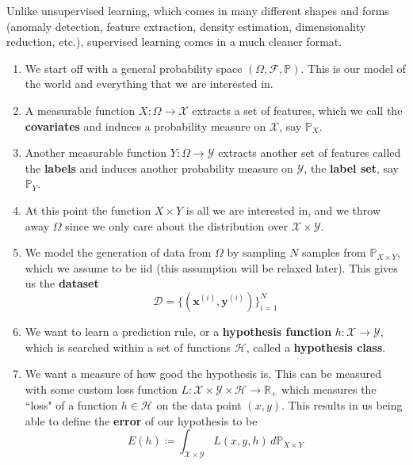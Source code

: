 \documentclass{article}
\begin{document}
    Unlike unsupervised learning, which comes in many different shapes and forms (anomaly detection, feature extraction, density estimation, dimensionality reduction, etc.), supervised learning comes in a much cleaner format. 
    \begin{enumerate}
      \item We start off with a general probability space $(\Omega, \mathcal{F}, \mathbb{P})$. This is our model of the world and everything that we are interested in. 

      \item A measurable function $X: \Omega \rightarrow \mathcal{X}$ extracts a set of features, which we call the \textbf{covariates} and induces a probability measure on $\mathcal{X}$, say $\mathbb{P}_X$. 

      \item Another measurable function $Y: \Omega \rightarrow \mathcal{Y}$ extracts another set of features called the \textbf{labels} and induces another probability measure on $\mathcal{Y}$, the \textbf{label set}, say $\mathbb{P}_Y$. 

      \item At this point the function $X \times Y$ is all we are interested in, and we throw away $\Omega$ since we only care about the distribution over $\mathcal{X} \times \mathcal{Y}$. 

      \item We model the generation of data from $\Omega$ by sampling $N$ samples from $\mathbb{P}_{X \times Y}$, which we assume to be iid (this assumption will be relaxed later). This gives us the \textbf{dataset} 
        \[\mathcal{D} = \{(\mathbf{x}^{(i)}, \mathbf{y}^{(i)}) \}_{i=1}^N\]

      \item We want to learn a prediction rule, or a \textbf{hypothesis function} $h: \mathcal{X} \rightarrow \mathcal{Y}$, which is searched within a set of functions $\mathcal{H}$, called a \textbf{hypothesis class}. 

      \item We want a measure of how good the hypothesis is. This can be measured with some custom loss function $L: \mathcal{X} \times \mathcal{Y} \times \mathcal{H} \rightarrow \mathbb{R}_+$ which measures the ``loss" of a function $h \in \mathcal{H}$ on the data point $(x, y)$. This results in us being able to define the \textbf{error} of our hypothesis to be 
        \[E(h) \coloneqq \int_{\mathcal{X} \times \mathcal{Y}} L (x, y, h) \,d\mathbb{P}_{X \times Y}\]
    \end{enumerate}
\end{document}
